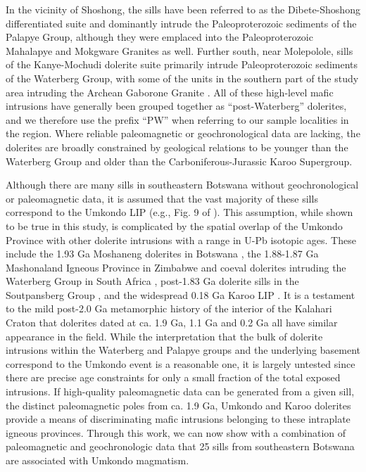 \documentclass[11pt,letterpaper]{article}
\begin{document}
In the vicinity of Shoshong, the sills have been referred to as the Dibete-Shoshong differentiated suite \citep{Carney1994a} and dominantly intrude the Paleoproterozoic sediments of the Palapye Group, although they were emplaced into the Paleoproterozoic Mahalapye and Mokgware Granites as well. Further south, near Molepolole, sills of the Kanye-Mochudi dolerite suite primarily intrude Paleoproterozoic sediments of the Waterberg Group, with some of the units in the southern part of the study area intruding the Archean Gaborone Granite \citep{Carney1994a}. All of these high-level mafic intrusions have generally been grouped together as ``post-Waterberg'' dolerites, and we therefore use the prefix ``PW'' when referring to our sample localities in the region. Where reliable paleomagnetic or geochronological data are lacking, the dolerites are broadly constrained by geological relations to be younger than the Waterberg Group and older than the Carboniferous-Jurassic Karoo Supergroup. 

Although there are many sills in southeastern Botswana without geochronological or paleomagnetic data, it is assumed that the vast majority of these sills correspond to the Umkondo LIP (e.g., Fig. 9 of \citealp{Hanson2006a}). This assumption, while shown to be true in this study, is complicated by the spatial overlap of the Umkondo Province with other dolerite intrusions with a range in U-Pb isotopic ages. These include the 1.93 Ga Moshaneng dolerites in Botswana \citep{Hanson2004b}, the 1.88-1.87 Ga Mashonaland Igneous Province in Zimbabwe and coeval dolerites intruding the Waterberg Group in South Africa \citep{Hanson2004b,Hanson2011b,Soderlund2010a}, post-1.83 Ga dolerite sills in the Soutpansberg Group \citep{Brandl1981a,Brandl1985a,Geng2014a}, and the widespread 0.18 Ga Karoo LIP \citep{Sell2014a}. It is a testament to the mild post-2.0 Ga metamorphic history of the interior of the Kalahari Craton that dolerites dated at ca. 1.9 Ga, 1.1 Ga and 0.2 Ga all have similar appearance in the field. While the interpretation that the bulk of dolerite intrusions within the Waterberg and Palapye groups and the underlying basement correspond to the Umkondo event is a reasonable one, it is largely untested since there are precise age constraints for only a small fraction of the total exposed intrusions. If high-quality paleomagnetic data can be generated from a given sill, the distinct paleomagnetic poles from ca. 1.9 Ga, Umkondo and Karoo dolerites provide a means of discriminating mafic intrusions belonging to these intraplate igneous provinces. Through this work, we can now show with a combination of paleomagnetic and geochronologic data that 25 sills from southeastern Botswana are associated with Umkondo magmatism.
\end{document}
